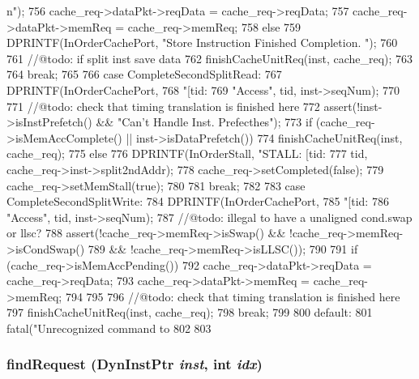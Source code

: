 \begin{DoxyCode}
{{{{      n");
756                 cache_req->dataPkt->reqData = cache_req->reqData;
757                 cache_req->dataPkt->memReq = cache_req->memReq;
758             } else
759                 DPRINTF(InOrderCachePort, "Store Instruction Finished Completion.
      \n");
760 
761             //@todo: if split inst save data
762             finishCacheUnitReq(inst, cache_req);
763         }
764         break;
765 
766       case CompleteSecondSplitRead:
767         DPRINTF(InOrderCachePort,
768                 "[tid:%
769                 "Access\n", tid, inst->seqNum);
770 
771         //@todo: check that timing translation is finished here
772         assert(!inst->isInstPrefetch() && "Can't Handle Inst. Prefecthes");
773         if (cache_req->isMemAccComplete() || inst->isDataPrefetch()) {
774             finishCacheUnitReq(inst, cache_req);
775         } else {
776             DPRINTF(InOrderStall, "STALL: [tid:%
777                     tid, cache_req->inst->split2ndAddr);
778             cache_req->setCompleted(false);
779             cache_req->setMemStall(true);            
780         }
781         break;
782 
783       case CompleteSecondSplitWrite:
784         DPRINTF(InOrderCachePort,
785                 "[tid:%
786                 "Access\n", tid, inst->seqNum);
787         //@todo: illegal to have a unaligned cond.swap or llsc?
788         assert(!cache_req->memReq->isSwap() && !cache_req->memReq->isCondSwap()
789                && !cache_req->memReq->isLLSC());
790 
791         if (cache_req->isMemAccPending()) {
792             cache_req->dataPkt->reqData = cache_req->reqData;
793             cache_req->dataPkt->memReq = cache_req->memReq;
794         }
795 
796         //@todo: check that timing translation is finished here
797         finishCacheUnitReq(inst, cache_req);
798         break;
799         
800       default:
801         fatal("Unrecognized command to %
802     }
803 }
\end{DoxyCode}
\hypertarget{classCacheUnit_abfbefbe2451158a25d064523dcb3d6bd}{
\subsubsection[{findRequest}]{ findRequest ({\bf DynInstPtr} {\em inst}, \/  int {\em idx})}}
\label{classCacheUnit_abfbefbe2451158a25d064523dcb3d6bd}



